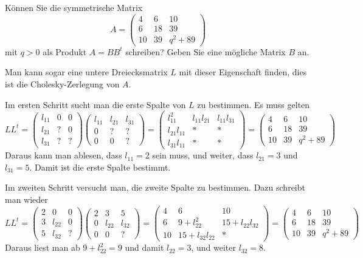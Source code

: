 Können Sie die symmetrische Matrix
\[
A=\begin{pmatrix}
 4& 6&10\\
 6&18&39\\
10&39&q^2 + 89
\end{pmatrix}
\]
mit $q>0$ als Produkt $A=BB^t$ schreiben?
Geben Sie eine mögliche Matrix $B$ an.

\begin{loesung}
Man kann sogar eine untere Dreiecksmatrix $L$ mit dieser Eigenschaft finden,
dies ist die Cholesky-Zerlegung von $A$.

Im ersten Schritt sucht man die erste Spalte von $L$ zu bestimmen.
Es muss gelten
\[
LL^t=
\begin{pmatrix}
l_{11}&  0&  0\\
l_{21}&  ?&  0\\
l_{31}&  ?&  ?
\end{pmatrix}
\begin{pmatrix}
l_{11}&l_{21}&l_{31}\\
     0&     ?&     ?\\
     0&     0&     ?
\end{pmatrix}
=
\begin{pmatrix}
    l_{11}^2&l_{11}l_{21}&l_{11}l_{31}\\
l_{21}l_{11}&           *&           *\\
l_{31}l_{11}&           *&           *
\end{pmatrix}
=
\begin{pmatrix}
 4& 6&10\\
 6&18&39\\
10&39&q^2 + 89
\end{pmatrix}
\]
Daraus kann man ablesen, dass $l_{11}=2$ sein muss, und weiter,
dass
$l_{21}=3$ und $l_{31}=5$. Damit ist die erste Spalte bestimmt.

Im zweiten Schritt versucht man, die zweite Spalte zu bestimmen.
Dazu schreibt man wieder
\[
LL^t
=
\begin{pmatrix}
2&     0&0\\
3&l_{22}&0\\
5&l_{32}&?
\end{pmatrix}
\begin{pmatrix}
2&     3&     5\\
0&l_{22}&l_{32}\\
0&     0&?
\end{pmatrix}
=
\begin{pmatrix}
 4&              6&            10\\
 6& 9+l_{22}^2    &15+l_{22}l_{32}\\
10&15+l_{32}l_{22}&             *
\end{pmatrix}
=
\begin{pmatrix}
 4& 6&10\\
 6&18&39\\
10&39& q^2 + 89
\end{pmatrix}
\]
Daraus liest man ab $9+l_{22}^2=9$ und damit $l_{22}=3$, und weiter
$l_{32}=8$.


\end{loesung}
